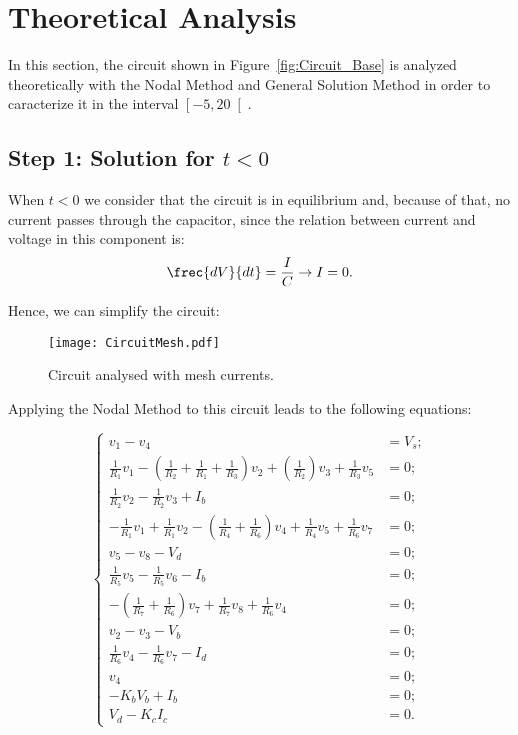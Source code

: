 \section{Theoretical Analysis}
\label{sec:analysis}

In this section, the circuit shown in Figure~\ref{fig:Circuit_Base} is analyzed theoretically with the Nodal Method and General Solution Method in order to caracterize it in the interval $\left[-5,20\right[$.

\subsection{Step 1: Solution for $t<0$}

When $t<0$ we consider that the circuit is in equilibrium and, because of that, no current passes through the capacitor, since the relation between current and voltage in this component is:
\begin{equation}
  \frec{dV}{dt}=\frac{I}{C} \rightarrow I = 0.
  \label{eq:Cap}
\end{equation}

Hence, we can simplify the circuit:
\begin{figure}[h] \centering
\texttt{[image: CircuitMesh.pdf]}
\caption{Circuit analysed with mesh currents.}
\label{fig:Circuit_Passo1}
\end{figure}

Applying the Nodal Method to this circuit leads to the following equations:

\begin{equation}
\begin{cases}
	v_1 - v_4 &= V_s;																				  \\
	\frac{1}{R_1}v_1 - (\frac{1}{R_2}+\frac{1}{R_1}+\frac{1}{R_3})v_2 + (\frac{1}{R_2})v_3 + \frac{1}{R_3}v_5 &= 0; 																						  \\
  	\frac{1}{R_2}v_2 - \frac{1}{R_2}v_3+ I_b &= 0;													  \\
  	-\frac{1}{R_1}v_1 + \frac{1}{R_1}v_2 - (\frac{1}{R_4}+\frac{1}{R_6})v_4 + \frac{1}{R_4}v_5 + \frac{1}{R_6}v_7 &= 0;			  																	  \\
	v_5 - v_8 - V_d &= 0;																			  \\
  	\frac{1}{R_5}v_5 - \frac{1}{R_5}v_6 - I_b &= 0;												  	  \\
  	-(\frac{1}{R_7}+\frac{1}{R_6})v_7 + \frac{1}{R_7}v_8 + \frac{1}{R_6}v_4 &= 0;					  \\
	v_2 - v_3 - V_b &= 0;																			  \\
  	\frac{1}{R_6}v_4 - \frac{1}{R_6}v_7 - I_d &= 0;													  \\
  	v_4 &= 0;																						  \\
  	-K_bV_b + I_b &= 0;																				  \\
  	V_d - K_cI_c &= 0.
\end{cases}
\end{equation}

